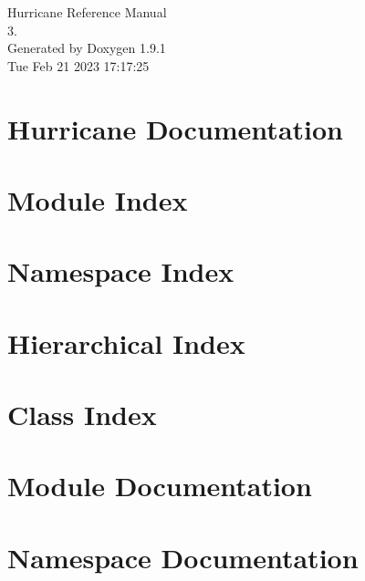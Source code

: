 \documentclass[a4paper]{asimbook}
\begin{document}
   \begin{titlepage}
     \vspace*{7cm}
     \begin{center}
     {\Large Hurricane Reference Manual\\[1ex]\large 3. }\\
     \vspace*{1cm}
     {\large Generated by Doxygen 1.9.1}\\
     \vspace*{0.5cm}
     {\small Tue Feb 21 2023 17:17:25}\\
     \end{center}
   \end{titlepage}

   \clearemptydoublepage

   \tableofcontents
   \clearemptydoublepage

\chapter{Hurricane Documentation}
\label{index}\hypertarget{index}{}
\chapter{Module Index}

\chapter{Namespace Index}

\chapter{Hierarchical Index}

\chapter{Class Index}

\chapter{Module Documentation}




\chapter{Namespace Documentation}

\end{document}
